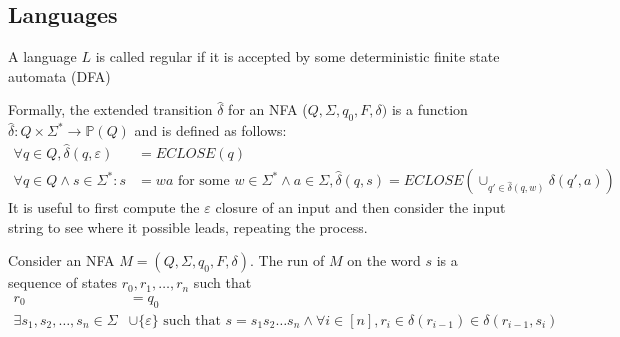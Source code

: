 \documentclass[a4paper]{article}
\theoremstyle{plain}
\newtheorem*{cor}{Corollary}
\theoremstyle{definition}
\newtheorem{defn}{Definition}[section]
\theoremstyle{remark}
\begin{document}
\subsection{Languages}
\begin{tcolorbox}[colback=black!3!white,colframe=black!60!white,title=\begin{defn}Regular Language \label{Regular Language}\end{defn}]
A language $L$ is called regular if it is accepted by some deterministic finite state automata (DFA)
\end{tcolorbox}
\begin{tcolorbox}[colback=black!3!white,colframe=black!60!white,title=\begin{defn}NFA \label{NFA}\end{defn}]
Formally, the extended transition $\hat{\delta}$ for an NFA ($Q,\Sigma,q_0,F,\delta)$ is a function $\hat{\delta}: Q \times \Sigma^{*} \to \mathbb{P}(Q)$ and is defined as follows:
\begin{align}
	\forall q \in Q, \hat{\delta}(q,\varepsilon) &= ECLOSE(q) \\
\forall q \in Q \land s \in \Sigma^{*} : s&=wa \text{ for some } w \in \Sigma^{*} \land a \in \Sigma, \hat{\delta}(q,s) = ECLOSE(\cup_{q'\in \hat{\delta}(q,w)} \delta(q',a))
\end{align}
It is useful to first compute the $\varepsilon$ closure of an input and then consider the input string to see where it possible leads, repeating the process.
\end{tcolorbox}
\begin{tcolorbox}[colback=black!3!white,colframe=black!60!white,title=\begin{cor}Language of NFA \label{Language of NFA}\end{cor}]
        Consider an NFA $M = (Q,\Sigma,q_0,F,\delta)$. The run of $M$ on the word $s$ is a sequence of states $r_0,r_1,\ldots,r_n$ such that
                \begin{align}
			r_0 &= q_0 \\
			\exists s_1,s_2,\ldots,s_n \in \Sigma& \cup \{\varepsilon\} \text{ such that } s = s_1s_2\ldots s_n \land \forall i \in [n], r_i \in \delta(r_{i-1}) \in \delta(r_{i-1},s_i)
                \end{align}
\end{tcolorbox}
\end{document}
